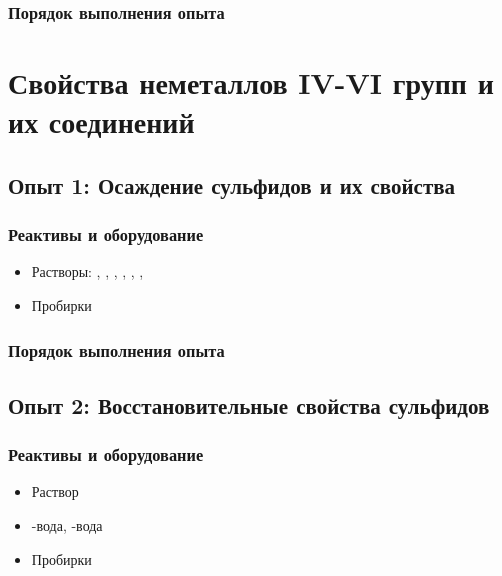 \documentclass[a4paper, 12pt]{article}
\begin{document}
\subsubsection{Порядок выполнения опыта}

\newpage


\section{Свойства неметаллов IV-VI групп и их соединений}

\subsection{Опыт 1: Осаждение сульфидов и их свойства}

\subsubsection{Реактивы и оборудование}

\begin{itemize}
	\item Растворы: , , , , , , 
	
	\item Пробирки
\end{itemize}

\subsubsection{Порядок выполнения опыта}

\subsection{Опыт 2: Восстановительные свойства сульфидов}

\subsubsection{Реактивы и оборудование}

\begin{itemize}
	\item Раствор 
	
	\item {}-вода, -вода
	
	\item Пробирки
\end{itemize}
\end{document}
